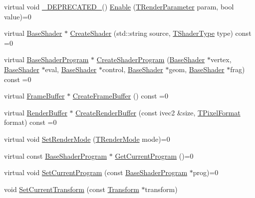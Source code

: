 \begin{DoxyCompactItemize}
\item 
virtual void \hyperlink{_common_defines_8h_a6602c025738b10d509fc133dabf88869}{\+\_\+\+D\+E\+P\+R\+E\+C\+A\+T\+E\+D\+\_\+}() \hyperlink{class_agmd_1_1_driver_aed5a533b299939f97e60de0897ca6cfb}{Enable} (\hyperlink{namespace_agmd_afc630cffacc9bfc42e46816feb4744ae}{T\+Render\+Parameter} param, bool value)=0
\item 
virtual \hyperlink{class_agmd_1_1_base_shader}{Base\+Shader} $\ast$ \hyperlink{class_agmd_1_1_driver_a8e8346a9341169d7486f8418a7671f67}{Create\+Shader} (std\+::string source, \hyperlink{namespace_agmd_a162a493eaff1589f07a505806e6724b4}{T\+Shader\+Type} type) const =0
\item 
virtual \hyperlink{class_agmd_1_1_base_shader_program}{Base\+Shader\+Program} $\ast$ \hyperlink{class_agmd_1_1_driver_afa92f4325c4af6876919627e76aa6e28}{Create\+Shader\+Program} (\hyperlink{class_agmd_1_1_base_shader}{Base\+Shader} $\ast$vertex, \hyperlink{class_agmd_1_1_base_shader}{Base\+Shader} $\ast$eval, \hyperlink{class_agmd_1_1_base_shader}{Base\+Shader} $\ast$control, \hyperlink{class_agmd_1_1_base_shader}{Base\+Shader} $\ast$geom, \hyperlink{class_agmd_1_1_base_shader}{Base\+Shader} $\ast$frag) const =0
\item 
virtual \hyperlink{class_agmd_1_1_frame_buffer}{Frame\+Buffer} $\ast$ \hyperlink{class_agmd_1_1_driver_a7c431ff6b04e96f258b987ae8d922a9c}{Create\+Frame\+Buffer} () const =0
\item 
virtual \hyperlink{class_agmd_1_1_render_buffer}{Render\+Buffer} $\ast$ \hyperlink{class_agmd_1_1_driver_a879e98a0d21b772b487b358dd912429b}{Create\+Render\+Buffer} (const ivec2 \&size, \hyperlink{namespace_agmd_afc48fd9fa5dccb4c5621c052bfd1a7ec}{T\+Pixel\+Format} format) const =0
\item 
virtual void \hyperlink{class_agmd_1_1_driver_a6edc110be95fa6c2922a13ce025d8aa4}{Set\+Render\+Mode} (\hyperlink{namespace_agmd_aa4cbd15e55e815e187c31a8f435addae}{T\+Render\+Mode} mode)=0
\item 
virtual const \hyperlink{class_agmd_1_1_base_shader_program}{Base\+Shader\+Program} $\ast$ \hyperlink{class_agmd_1_1_driver_a2b14b7ecb1a8533e2b4e80d88fc95656}{Get\+Current\+Program} ()=0
\item 
virtual void \hyperlink{class_agmd_1_1_driver_ac6d8e0a25e5bac4591731a006338eeb3}{Set\+Current\+Program} (const \hyperlink{class_agmd_1_1_base_shader_program}{Base\+Shader\+Program} $\ast$prog)=0
\item 
void \hyperlink{class_agmd_1_1_driver_a5d026607f63acff5dd9c14cc86ec1142}{Set\+Current\+Transform} (const \hyperlink{class_agmd_maths_1_1_transform}{Transform} $\ast$transform)

\end{DoxyCompactItemize}
